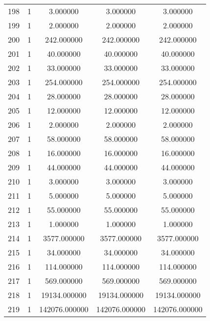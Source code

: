 \documentclass[a4paper,12pt]{article}
\begin{document}
\begin{center}
\begin{longtable}{l S[table-format=3.0] S[table-format=8.2] S[table-format=8.2] S[table-format=8.2]}
        198   &   1   &     3.000000   &      3.000000     &       3.000000 \\
        199   &   1   &     2.000000   &      2.000000     &       2.000000 \\
        200   &   1   &   242.000000   &    242.000000     &     242.000000 \\
        201   &   1   &    40.000000   &     40.000000     &      40.000000 \\
        202   &   1   &    33.000000   &     33.000000     &      33.000000 \\
        203   &   1   &   254.000000   &    254.000000     &     254.000000 \\
        204   &   1   &    28.000000   &     28.000000     &      28.000000 \\
        205   &   1   &    12.000000   &     12.000000     &      12.000000 \\
        206   &   1   &     2.000000   &      2.000000     &       2.000000 \\
        207   &   1   &    58.000000   &     58.000000     &      58.000000 \\
        208   &   1   &    16.000000   &     16.000000     &      16.000000 \\
        209   &   1   &    44.000000   &     44.000000     &      44.000000 \\
        210   &   1   &     3.000000   &      3.000000     &       3.000000 \\
        211   &   1   &     5.000000   &      5.000000     &       5.000000 \\
        212   &   1   &    55.000000   &     55.000000     &      55.000000 \\
        213   &   1   &     1.000000   &      1.000000     &       1.000000 \\
        214   &   1   &  3577.000000   &   3577.000000     &    3577.000000 \\
        215   &   1   &    34.000000   &     34.000000     &      34.000000 \\
        216   &   1   &   114.000000   &    114.000000     &     114.000000 \\
        217   &   1   &   569.000000   &    569.000000     &     569.000000 \\
        218   &   1   & 19134.000000   &   19134.000000     &   19134.000000 \\
        219   &   1   & 142076.000000  &  142076.000000     &  142076.000000 \\

\end{longtable}
\end{center}
\end{document}
